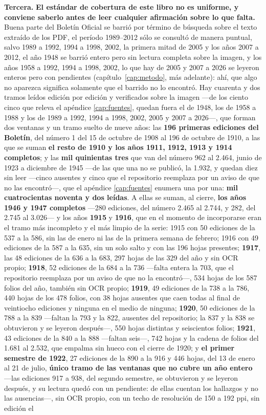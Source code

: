\textbf{Tercera.} \textbf{El estándar de cobertura de este libro no es uniforme, y conviene saberlo antes de leer cualquier afirmación sobre lo que falta.} Buena parte del Boletín Oficial se barrió por término de búsqueda sobre el texto extraído de los PDF, el período 1989--2012 sólo se consultó de manera puntual, salvo 1989 a 1992, 1994 a 1998, 2002, la primera mitad de 2005 y los años 2007 a 2012, el año 1948 se barrió entero pero sin lectura completa sobre la imagen, y los años 1958 a 1992, 1994 a 1998, 2002, lo que hay de 2005 y 2007 a 2026 se leyeron enteros pero con pendientes (capítulo~\ref{cap:metodo}, más adelante): ahí, que algo no aparezca significa solamente que el barrido no lo encontró. Hay cuarenta y dos tramos leídos edición por edición y verificados sobre la imagen ---de los ciento cinco que releva el apéndice \ref{cap:fuentes}, quedan fuera el de 1948, los de 1958 a 1988 y los de 1989 a 1992, 1994 a 1998, 2002, 2005 y 2007 a 2026---, que forman dos ventanas y un tramo suelto de nueve años: las \textbf{196 primeras ediciones del Boletín}, del número 1 del 15 de octubre de 1908 al 196 de octubre de 1910, a las que se suman \textbf{el resto de 1910 y los años 1911, 1912, 1913 y 1914 completos}; y las \textbf{mil quinientas tres} que van del número 962 al 2.464, junio de 1923 a diciembre de 1945 ---de las que una no se publicó, la 1.932, y quedan diez sin leer ---cinco ausentes y cinco que el repositorio reemplaza por un aviso de que no las encontró---, que el apéndice \ref{cap:fuentes} enumera una por una: \textbf{mil cuatrocientas noventa y dos leídas}. A ellas se suman, al cierre, \textbf{los años 1946 y 1947 completos} ---280 ediciones, del número 2.465 al 2.744, y 282, del 2.745 al 3.026--- y los años \textbf{1915} y \textbf{1916}, que en el momento de incorporarse eran el tramo más incompleto y el más limpio de la serie: 1915 con 50 ediciones de la 537 a la 586, sin las de enero ni las de la primera semana de febrero; 1916 con 49 ediciones de la 587 a la 635, sin un solo salto y con las 196 hojas presentes; \textbf{1917}, las 48 ediciones de la 636 a la 683, 297 hojas de las 329 del año y sin OCR propio; \textbf{1918}, 52 ediciones de la 684 a la 736 ---falta entera la 703, que el repositorio reemplaza por un aviso de que no la encontró---, 534 hojas de los 587 folios del año, también sin OCR propio; \textbf{1919}, 49 ediciones de la 738 a la 786, 440 hojas de los 478 folios, con 38 hojas ausentes que caen todas al final de veintiocho ediciones y ninguna en el medio de ninguna; \textbf{1920}, 50 ediciones de la 788 a la 839 ---faltan la 793 y la 822, ausentes del repositorio; la 837 y la 838 se obtuvieron y se leyeron después---, 550 hojas distintas y seiscientos folios; \textbf{1921}, 43 ediciones de la 840 a la 888 ---faltan seis---, 742 hojas y la cadena de folios del 1.681 al 2.532, que empalma sin hueco con el cierre de 1920; y \textbf{el primer semestre de 1922}, 27 ediciones de la 890 a la 916 y 446 hojas, del 13 de enero al 21 de julio, \textbf{único tramo de las ventanas que no cubre un año entero} ---las ediciones 917 a 938, del segundo semestre, se obtuvieron y se leyeron después, y su lectura quedó con un pendiente: de ellas cuentan los hallazgos y no las ausencias---, sin OCR propio, con un techo de resolución de 150 a 192 ppi, sin edición el 